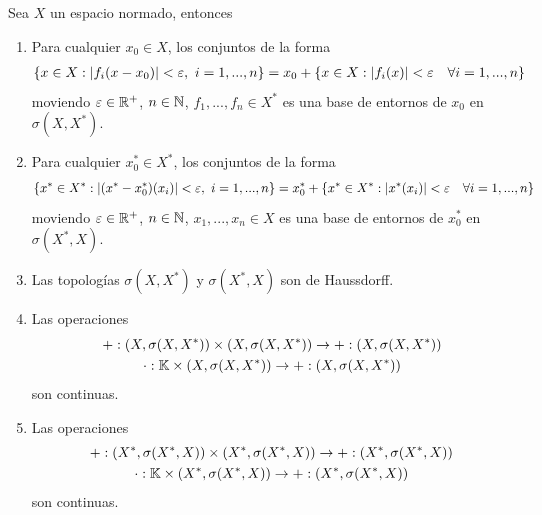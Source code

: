 \begin{prop}
    Sea $X$ un espacio normado, entonces
    \begin{enumerate}[label=\alph*)]
        \item Para cualquier $x_0\in X$, los conjuntos de la forma
        \begin{gather*}
            \{x\in X : |f_i(x-x_0)| < \varepsilon,\ i=1,...,n\} = x_0 + \{x\in X : |f_i(x)|< \varepsilon \quad \forall i=1,...,n \}
        \end{gather*}
        moviendo $\varepsilon\in \mathbb{R}^+$, $n\in \mathbb{N}$, $f_1,...,f_n\in X^*$ es una base de entornos de $x_0$ en $\sigma(X,X^*)$.

        \item Para cualquier $x_0^*\in X^*$, los conjuntos de la forma
        \begin{gather*}
            \{x^*\in X^* : |(x^*-x_0^*)(x_i)| < \varepsilon,\ i=1,...,n\} = x_0^* + \{x^*\in X^* : |x^*(x_i)|< \varepsilon \quad \forall i=1,...,n \}
        \end{gather*}
        moviendo $\varepsilon\in \mathbb{R}^+$, $n\in \mathbb{N}$, $x_1, ..., x_n\in X$ es una base de entornos de $x_0^*$ en $\sigma(X^*,X)$.

        \item Las topologías $\sigma(X, X^*)$ y $\sigma(X^*, X)$ son de Haussdorff.
        
        \item Las operaciones
        \begin{gather*}
            +: (X, \sigma(X, X^*)) \times (X, \sigma(X, X^*)) \to +: (X, \sigma(X, X^*))\\
            \cdot: \mathbb{K} \times (X, \sigma(X, X^*)) \to +: (X, \sigma(X, X^*))
        \end{gather*}
        son continuas.

        \item Las operaciones
        \begin{gather*}
            +: (X^*, \sigma(X^*, X)) \times (X^*, \sigma(X^*, X)) \to +: (X^*, \sigma(X^*, X))\\
            \cdot: \mathbb{K} \times (X^*, \sigma(X^*, X)) \to +: (X^*, \sigma(X^*, X))
        \end{gather*}
        son continuas.
    \end{enumerate}
\end{prop}




